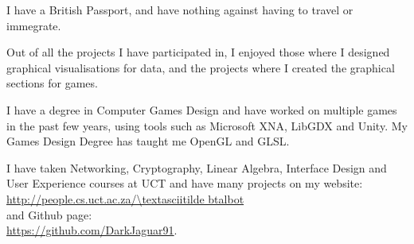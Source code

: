 \documentclass[11pt,a4paper,sans]{moderncv}
\begin{document}
I have a British Passport, and have nothing against having to travel or immegrate.

Out of all the projects I have participated in, I enjoyed those where I designed graphical visualisations for data, and the projects where I created the graphical sections for games.

I have a degree in Computer Games Design and have worked on multiple games in the past few years, using tools such as Microsoft XNA, LibGDX and Unity. My Games Design Degree has taught me OpenGL and GLSL.  

I have taken Networking, Cryptography, Linear Algebra, Interface Design and User Experience courses at UCT and have many projects on my website: \url{http://people.cs.uct.ac.za/\textasciitilde btalbot}\\and Github page:\\ \url{https://github.com/DarkJaguar91}.


\makeletterclosing

\clearpage
\end{document}
